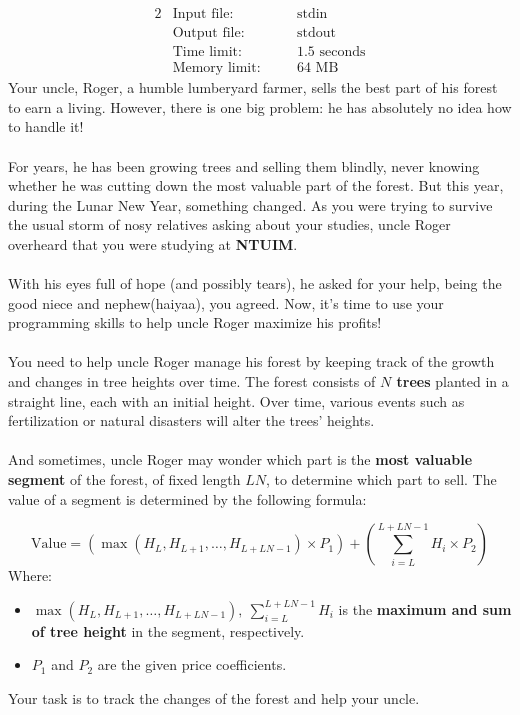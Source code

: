 \documentclass[12pt,a4paper]{article}
\begin{document}
\begin{alignat*} {2}
 &   \text{Input file:}   \quad     &&\text{stdin}\\
 &   \text{Output file:}  \quad     &&\text{stdout}\\
 &   \text{Time limit:}   \quad     &&\text{1.5 seconds}\\
 &   \text{Memory limit:} \quad     &&\text{64 MB}
\end{alignat*}
\noindent
Your uncle, Roger, a humble lumberyard farmer, sells the best part of his forest to earn a living. However, there is one big problem: he has absolutely no idea how to handle it! 
\\\\
\noindent
For years, he has been growing trees and selling them blindly, never knowing whether he was cutting down the most valuable part of the forest. But this year, during the Lunar New Year, something changed. As you were trying to survive the usual storm of nosy relatives asking about your studies, uncle Roger overheard that you were studying at \textbf{NTUIM}.  
\\\\
\noindent
With his eyes full of hope (and possibly tears), he asked for your help, being the good niece and nephew(haiyaa), you agreed. Now, it's time to use your programming skills to help uncle Roger maximize his profits!
\\\\
\noindent
You need to help uncle Roger manage his forest by keeping track of the growth and changes in tree heights over time. The forest consists of \textbf{\(N\) trees} planted in a straight line, each with an initial height. Over time, various events such as fertilization or natural disasters will alter the trees' heights.
\\\\
\noindent
And sometimes, uncle Roger may wonder which part is the \textbf{most valuable segment} of the forest, of fixed length \textbf{\(LN\)}, to determine which part to sell. The value of a segment is determined by the following formula:

\[
\text{Value} = (\max(H_L, H_{L+1}, \dots, H_{L+LN-1}) \times P_1) + (\sum_{i=L}^{L+LN-1} H_i \times P_2)
\]
\noindent
Where:
\begin{itemize}
    \item \( \max(H_L, H_{L+1}, \dots, H_{L+LN-1}),\ \sum_{i=L}^{L+LN-1} H_i \) is the \textbf{maximum and sum of tree height} in the segment, respectively.
    \item \( P_1 \) and \( P_2 \) are the given price coefficients.
\end{itemize}
\noindent
Your task is to track the changes of the forest and help your uncle.
\end{document}
